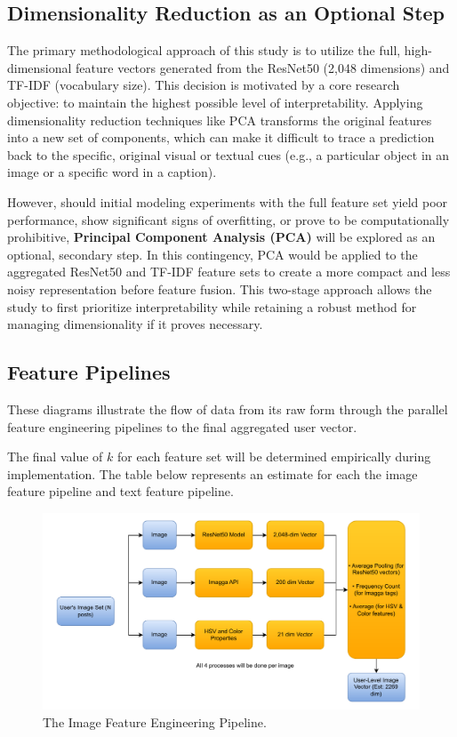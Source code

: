 \subsection{Dimensionality Reduction as an Optional Step}
The primary methodological approach of this study is to utilize the full, high-dimensional feature vectors generated from the ResNet50 (2,048 dimensions) and TF-IDF (vocabulary size). This decision is motivated by a core research objective: to maintain the highest possible level of interpretability. Applying dimensionality reduction techniques like PCA transforms the original features into a new set of components, which can make it difficult to trace a prediction back to the specific, original visual or textual cues (e.g., a particular object in an image or a specific word in a caption).

However, should initial modeling experiments with the full feature set yield poor performance, show significant signs of overfitting, or prove to be computationally prohibitive, \textbf{Principal Component Analysis (PCA)} will be explored as an optional, secondary step. In this contingency, PCA would be applied to the aggregated ResNet50 and TF-IDF feature sets to create a more compact and less noisy representation before feature fusion. This two-stage approach allows the study to first prioritize interpretability while retaining a robust method for managing dimensionality if it proves necessary.

\subsection{Feature Pipelines}
These diagrams illustrate the flow of data from its raw form through the parallel feature engineering pipelines to the final aggregated user vector. 

The final value of $k$ for each feature set will be determined empirically during implementation. The table below represents an estimate for each the image feature pipeline and text feature pipeline.


\begin{figure}[H]
	\centering
	\includegraphics[width=\textwidth]{"figures/Image-Pipeline-Diagram.pdf"}
	\caption{The Image Feature Engineering Pipeline. }
	\label{fig:image_pipeline_diagram}
\end{figure}

